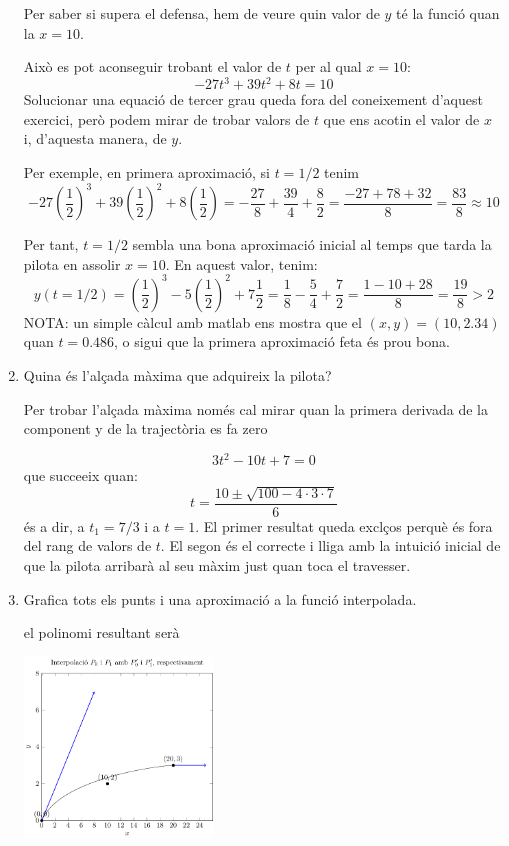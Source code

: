 \begin{enumerate}
Per saber si supera el defensa, hem de veure quin valor de $y$ té la funció quan la $x=10$.

Això es pot aconseguir trobant el valor de $t$ per al qual $x=10$:
\[-27 t^3 +39 t^2 +8t=10\]
Solucionar una equació de tercer grau queda fora del coneixement d'aquest exercici, però podem mirar de trobar valors de $t$ que ens acotin el valor de $x$ i, d'aquesta manera, de $y$.

Per exemple, en primera aproximació, si $t=1/2$ tenim
\[-27 \left(\frac{1}{2}\right)^3 +39  \left(\frac{1}{2}\right)^2 +8\left(\frac{1}{2}\right)=-\frac{27}{8}+\frac{39}{4}+\frac{8}{2}=\frac{-27+78+32}{8}=\frac{83}{8}\approx 10\]

Per tant, $t=1/2$ sembla una bona aproximació inicial al temps que tarda la pilota en assolir $x=10$. En aquest valor, tenim:
\[
  y(t=1/2)=\left(\frac{1}{2}\right)^3-5\left(\frac{1}{2}\right)^2+7\frac{1}{2}=\frac{1}{8}-\frac{5}{4}+\frac{7}{2}=\frac{1-10+28}{8}=\frac{19}{8}>2
\]
NOTA: un simple càlcul amb matlab ens mostra que el $(x,y)=(10,2.34)$ quan $t=0.486$, o sigui que la primera aproximació feta és prou bona.

  \item Quina és l'alçada màxima que adquireix la pilota?

  Per trobar l'alçada màxima només cal mirar quan la primera derivada de la component y de la trajectòria es fa zero

  \[
    3t^2-10t+7=0\]
    que succeeix quan: 
    \[
      t=\frac{10 \pm \sqrt{100-4\cdot 3\cdot 7}}{6}\]
    és a dir, a $t_1=7/3$ i a $t=1$. El primer resultat queda exclços perquè és fora del rang de valors de $t$. El segon és el correcte i lliga amb la intuició inicial de que la pilota arribarà al seu màxim just quan toca el travesser. 

  \item Grafica tots els punts i una aproximació a la funció interpolada.
  
  el polinomi resultant serà

\begin{center}
  \includegraphics[width=5cm]{../figures/interpolaciohermite2final.pdf}
\end{center}
\end{enumerate}
